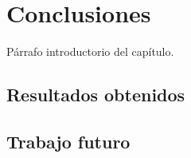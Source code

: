 \chapter{Conclusiones}
\label{Chapter5}

Párrafo introductorio del capítulo.

\section{Resultados obtenidos}

\section{Trabajo futuro}